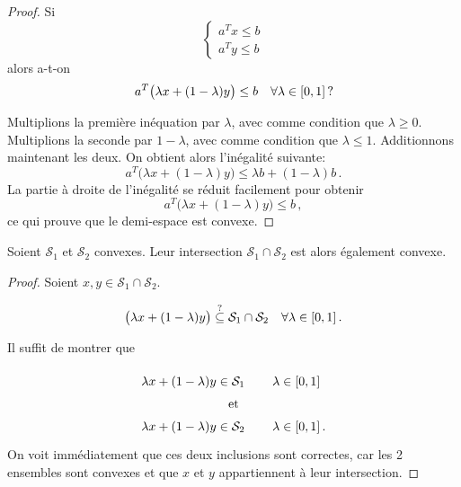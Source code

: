 	\begin{mytheo}\label{theo:demi-espace}\leavevmode
		\begin{proof}
			Si
			\[
			\left\{
			\begin{array}{c}
				a^T x \le b\\
				a^T y \le b
			\end{array}
			\right.
			\]
			alors a-t-on
			\[
			a^T \big(\lambda x + (1 - \lambda)y\big) \le b
			\quad \forall \lambda \in \interval{0}{1}\,?
			\]

			Multiplions la première inéquation par $\lambda$,
			avec comme condition que $\lambda \ge 0$.
			Multiplions la seconde par $1-\lambda$,
			avec comme condition que $\lambda \le 1$.
			Additionnons maintenant les deux.
			On obtient alors l'inégalité suivante:
			\[
			a^T \big(\lambda x + (1 - \lambda)y\big) \le
			\lambda b + (1-\lambda) b\,.
			\]
			La partie à droite de l'inégalité se réduit facilement
			pour obtenir
			\[
			a^T \big(\lambda x + (1 - \lambda)y\big) \le b\,,
			\]
			ce qui prouve que le demi-espace est convexe.
		\end{proof}
	\end{mytheo}

	\begin{mytheo}\label{theo:inter}\leavevmode
		Soient $\mathcal{S}_1$ et $\mathcal{S}_2$ convexes.
		Leur intersection $\mathcal{S}_1 \cap \mathcal{S}_2$
		est alors également convexe.

		\begin{proof}
			Soient $x,y \in \mathcal{S}_1 \cap \mathcal{S}_2$.

			\[
			\big(\lambda x + (1 - \lambda)y\big) \overset{?}{\subseteq} \mathcal{S}_1 \cap \mathcal{S}_2
			\quad \forall \lambda \in \interval{0}{1}\,.
			\]

			Il suffit de montrer que

			\[
			\renewcommand{\arraystretch}{1.5}
			\begin{tabular}{cl}
				$\lambda x + (1 - \lambda)y \in \mathcal{S}_1$ &
				$\quad \lambda \in \interval{0}{1}$\\
				\multicolumn{2}{c}{et}\\
				$\lambda x + (1 - \lambda)y \in \mathcal{S}_2$ &
				$\quad \lambda \in \interval{0}{1}\,.$\\
			\end{tabular}
			\]
			On voit immédiatement
			que ces deux inclusions sont correctes,
			car les 2 ensembles sont convexes
			et que $x$ et $y$ appartiennent à leur intersection.
		\end{proof}
	\end{mytheo}

